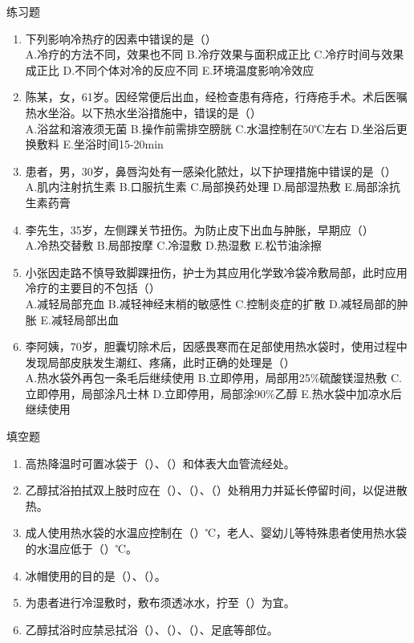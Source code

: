 \documentclass[11pt, a4paper]{ctexart}
\begin{document}
\begin{examplebox}{练习题}
	\begin{enumerate}
		\item 下列影响冷热疗的因素中错误的是（\qquad）\\
		      A.冷疗的方法不同，效果也不同 \quad B.冷疗效果与面积成正比 \quad C.冷疗时间与效果成正比 \quad D.不同个体对冷的反应不同 \quad E.环境温度影响冷效应
		\item 陈某，女，61岁。因经常便后出血，经检查患有痔疮，行痔疮手术。术后医嘱热水坐浴。以下热水坐浴措施中，错误的是（\qquad）\\
		      A.浴盆和溶液须无菌 \quad B.操作前需排空膀胱 \quad C.水温控制在50℃左右 \quad D.坐浴后更换敷料 \quad E.坐浴时间15-20min
		\item 患者，男，30岁，鼻唇沟处有一感染化脓灶，以下护理措施中错误的是（\qquad）\\
		      A.肌内注射抗生素 \quad B.口服抗生素 \quad C.局部换药处理 \quad D.局部湿热敷 \quad E.局部涂抗生素药膏
		\item 李先生，35岁，左侧踝关节扭伤。为防止皮下出血与肿胀，早期应（\qquad）\\
		      A.冷热交替敷 \quad B.局部按摩 \quad C.冷湿敷 \quad D.热湿敷 \quad E.松节油涂擦
		\item 小张因走路不慎导致脚踝扭伤，护士为其应用化学致冷袋冷敷局部，此时应用冷疗的主要目的不包括（\qquad）\\
		      A.减轻局部充血 \quad B.减轻神经末梢的敏感性 \quad C.控制炎症的扩散 \quad D.减轻局部的肿胀 \quad E.减轻局部出血
		\item 李阿姨，70岁，胆囊切除术后，因感畏寒而在足部使用热水袋时，使用过程中发现局部皮肤发生潮红、疼痛，此时正确的处理是（\qquad）\\
		      A.热水袋外再包一条毛后继续使用 \quad B.立即停用，局部用25\%硫酸镁湿热敷 \quad C.立即停用，局部涂凡士林 \quad D.立即停用，局部涂90\%乙醇 \quad E.热水袋中加凉水后继续使用
	\end{enumerate}
\end{examplebox}

\begin{tipsbox}{填空题}
	\begin{enumerate}
		\item 高热降温时可置冰袋于（\qquad）、（\qquad）和体表大血管流经处。
		\item 乙醇拭浴拍拭双上肢时应在（\qquad）、（\qquad）、（\qquad）处稍用力并延长停留时间，以促进散热。
		\item 成人使用热水袋的水温应控制在（\qquad）℃，老人、婴幼儿等特殊患者使用热水袋的水温应低于（\qquad）℃。
		\item 冰帽使用的目的是（\qquad）、（\qquad）。
		\item 为患者进行冷湿敷时，敷布须透冰水，拧至（\qquad）为宜。
		\item 乙醇拭浴时应禁忌拭浴（\qquad）、（\qquad）、（\qquad）、足底等部位。
	\end{enumerate}
\end{tipsbox}
\end{document}
